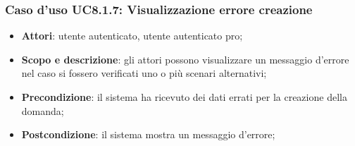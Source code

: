 	\subsubsection{Caso d'uso UC8.1.7: Visualizzazione errore creazione}
	\begin{itemize}
		\item
			\textbf{Attori}: utente autenticato, utente autenticato pro;
		\item
			\textbf{Scopo e descrizione}: gli attori possono visualizzare un messaggio d'errore nel caso si fossero verificati uno o più scenari alternativi;
		\item		
			\textbf{Precondizione}: il sistema ha ricevuto dei dati errati per la creazione della domanda;
		\item
			\textbf{Postcondizione}: il sistema mostra un messaggio d'errore;
	\end{itemize}	
